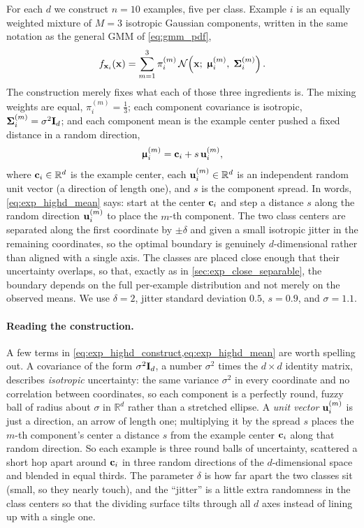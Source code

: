 \documentclass[11pt, letterpaper]{article}
\newcommand{\bSigma}{\vb{\Sigma}}
\newcommand{\bmu}{\boldsymbol{\upmu}}
\newcommand{\R}{\mathbb{R}}
\newcommand{\Norm}{\mathcal{N}}
\begin{document}
For each $d$ we construct $n = 10$ examples, five per class. Example $i$ is an equally weighted mixture of $M = 3$ isotropic Gaussian components, written in the same notation as the general GMM of \cref{eq:gmm_pdf},
\begin{equation}\label{eq:exp_highd_construct}
    f_{\vb{x}_i}(\vb{x}) = \sum_{m=1}^{3} \pi_i^{(m)}\, \Norm\!\left(\vb{x};\; \bmu_i^{(m)},\; \bSigma_i^{(m)}\right).
\end{equation}
The construction merely fixes what each of those three ingredients is. The mixing weights are equal, $\pi_i^{(m)} = \tfrac{1}{3}$; each component covariance is isotropic, $\bSigma_i^{(m)} = \sigma^2 \vb{I}_d$; and each component mean is the example center pushed a fixed distance in a random direction,
\begin{equation}\label{eq:exp_highd_mean}
    \bmu_i^{(m)} = \vb{c}_i + s\,\vb{u}_i^{(m)},
\end{equation}
where $\vb{c}_i \in \R^d$ is the example center, each $\vb{u}_i^{(m)} \in \R^d$ is an independent random unit vector (a direction of length one), and $s$ is the component spread. In words, \cref{eq:exp_highd_mean} says: start at the center $\vb{c}_i$ and step a distance $s$ along the random direction $\vb{u}_i^{(m)}$ to place the $m$-th component. The two class centers are separated along the first coordinate by $\pm \delta$ and given a small isotropic jitter in the remaining coordinates, so the optimal boundary is genuinely $d$-dimensional rather than aligned with a single axis. The classes are placed close enough that their uncertainty overlaps, so that, exactly as in \cref{sec:exp_close_separable}, the boundary depends on the full per-example distribution and not merely on the observed means. We use $\delta = 2$, jitter standard deviation $0.5$, $s = 0.9$, and $\sigma = 1.1$.

\paragraph{Reading the construction.} A few terms in \cref{eq:exp_highd_construct,eq:exp_highd_mean} are worth spelling out. A covariance of the form $\sigma^2 \vb{I}_d$, a number $\sigma^2$ times the $d \times d$ identity matrix, describes \emph{isotropic} uncertainty: the same variance $\sigma^2$ in every coordinate and no correlation between coordinates, so each component is a perfectly round, fuzzy ball of radius about $\sigma$ in $\R^d$ rather than a stretched ellipse. A \emph{unit vector} $\vb{u}_i^{(m)}$ is just a direction, an arrow of length one; multiplying it by the spread $s$ places the $m$-th component's center a distance $s$ from the example center $\vb{c}_i$ along that random direction. So each example is three round balls of uncertainty, scattered a short hop apart around $\vb{c}_i$ in three random directions of the $d$-dimensional space and blended in equal thirds. The parameter $\delta$ is how far apart the two classes sit (small, so they nearly touch), and the ``jitter'' is a little extra randomness in the class centers so that the dividing surface tilts through all $d$ axes instead of lining up with a single one.
\end{document}
